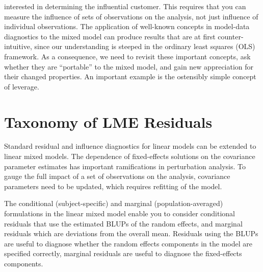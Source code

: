 \documentclass[12pt, a4paper]{report}
\theoremstyle{plain}
\theoremstyle{definition}
\theoremstyle{remark}
\begin{document}
		interested in determining the influential customer. This requires that you can measure the influence
		of sets of observations on the analysis, not just influence of individual observations.
The application of well-known concepts in model-data diagnostics to the mixed model can produce results
		that are at first counter-intuitive, since our understanding is steeped in the ordinary least squares
		(OLS) framework. As a consequence, we need to revisit these important concepts, ask whether they
		are “portable” to the mixed model, and gain new appreciation for their changed properties. An important
		example is the ostensibly simple concept of leverage. 

	

	
\section{Taxonomy of LME Residuals}

		
		Standard residual and influence diagnostics for linear models can
		be extended to linear mixed models. The dependence of
		fixed-effects solutions on the covariance parameter estimates has
		important ramifications in perturbation analysis. To gauge the
		full impact of a set of observations on the analysis, covariance
		parameters need to be updated, which requires refitting of the
		model.
		
		The conditional (subject-specific) and marginal
		(population-averaged) formulations in the linear mixed model
		enable you to consider conditional residuals that use the
		estimated BLUPs of the random effects, and marginal residuals
		which are deviations from the overall mean. Residuals using the
		BLUPs are useful to diagnose whether the random effects components
		in the model are specified correctly, marginal residuals are
		useful to diagnose the fixed-effects components.	
		
\end{document}
